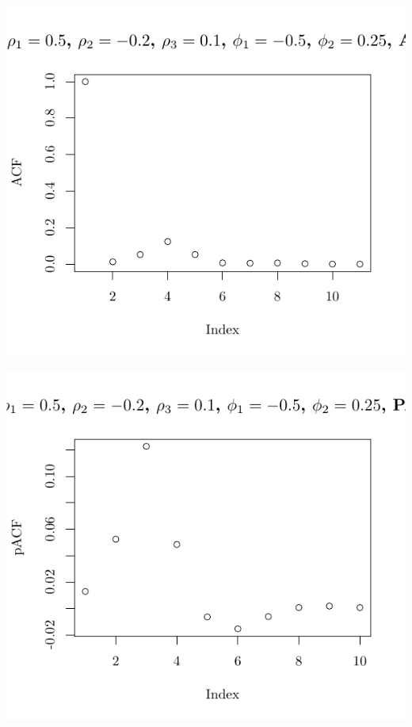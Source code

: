 \documentclass[10pt]{paper}\usepackage[]{graphicx}\usepackage[]{color}
\makeatletter
\def\maxwidth{ %
  \ifdim\Gin@nat@width>\linewidth
    \linewidth
  \else
    \Gin@nat@width
  \fi
}
\newenvironment{knitrout}{}{} %
\makeatother
\begin{document}
\begin{knitrout}
{\centering \includegraphics[width=\maxwidth]{figure/graphics-plotter-187} 

}




{\centering \includegraphics[width=\maxwidth]{figure/graphics-plotter-188} 

}





\end{knitrout}
\end{document}
